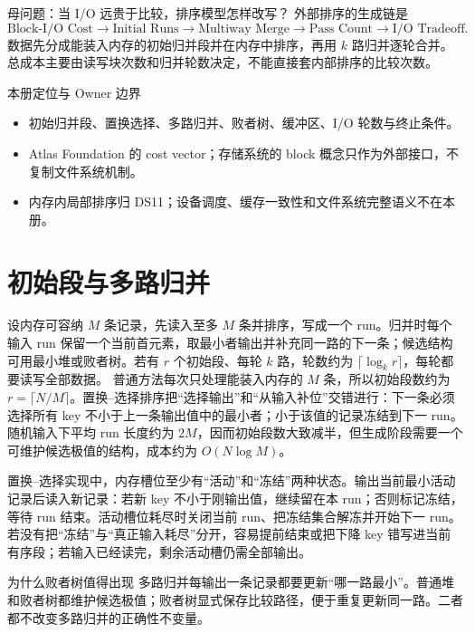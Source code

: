 \documentclass[UTF8,fontset=none,11pt,a4paper]{ctexart}
\begin{document}

\begin{corebox}{母问题：当 I/O 远贵于比较，排序模型怎样改写？}
外部排序的生成链是
\[
\text{Block-I/O Cost}\to\text{Initial Runs}\to\text{Multiway Merge}\to\text{Pass Count}\to\text{I/O Tradeoff}.
\]
数据先分成能装入内存的初始归并段并在内存中排序，再用 $k$ 路归并逐轮合并。总成本主要由读写块次数和归并轮数决定，不能直接套内部排序的比较次数。
\end{corebox}
\begin{methodbox}{本册定位与 Owner 边界}
\begin{itemize}
\item {}初始归并段、置换选择、多路归并、败者树、缓冲区、I/O 轮数与终止条件。
\item {}Atlas Foundation 的 cost vector；存储系统的 block 概念只作为外部接口，不复制文件系统机制。
\item {}内存内局部排序归 DS11；设备调度、缓存一致性和文件系统完整语义不在本册。
\end{itemize}
\end{methodbox}
\tableofcontents\newpage

\section{初始段与多路归并}
设内存可容纳 $M$ 条记录，先读入至多 $M$ 条并排序，写成一个 run。归并时每个输入 run 保留一个当前首元素，取最小者输出并补充同一路的下一条；候选结构可用最小堆或败者树。若有 $r$ 个初始段、每轮 $k$ 路，轮数约为 $\lceil\log_k r\rceil$，每轮都要读写全部数据。
普通方法每次只处理能装入内存的 $M$ 条，所以初始段数约为 $r=\lceil N/M\rceil$。置换--选择排序把“选择输出”和“从输入补位”交错进行：下一条必须选择所有 key 不小于上一条输出值中的最小者；小于该值的记录冻结到下一 run。随机输入下平均 run 长度约为 $2M$，因而初始段数大致减半，但生成阶段需要一个可维护候选极值的结构，成本约为 $O(N\log M)$。

置换--选择实现中，内存槽位至少有“活动”和“冻结”两种状态。输出当前最小活动记录后读入新记录：若新 key 不小于刚输出值，继续留在本 run；否则标记冻结，等待 run 结束。活动槽位耗尽时关闭当前 run、把冻结集合解冻并开始下一 run。若没有把“冻结”与“真正输入耗尽”分开，容易提前结束或把下降 key 错写进当前有序段；若输入已经读完，剩余活动槽仍需全部输出。
\begin{examplebox}{为什么败者树值得出现}
多路归并每输出一条记录都要更新“哪一路最小”。普通堆和败者树都维护候选极值；败者树显式保存比较路径，便于重复更新同一路。二者都不改变多路归并的正确性不变量。
\end{examplebox}
\end{document}
